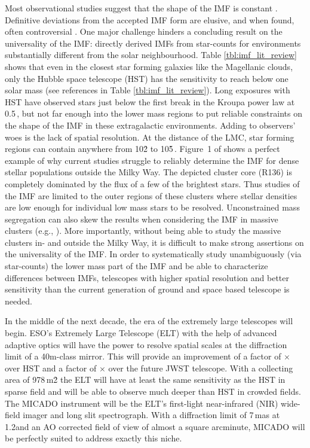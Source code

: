 Most observational studies suggest that the shape of the IMF is constant \citep{Lada2003-ip,Kroupa2002,Bastian2010}. Definitive deviations from the accepted IMF form are elusive, and when found, often controversial \citep{Van_Dokkum2010-gx,Conroy2012-hv,Drass2016-kp}. One major challenge hinders a concluding result on the universality of the IMF:  directly derived IMFs from star-counts for environments substantially different from the solar neighbourhood. 
Table \ref{tbl:imf_lit_review} shows that even in the closest star forming galaxies like the Magellanic clouds, only the Hubble space telescope (HST) has the sensitivity to reach below one solar mass (see references in Table \ref{tbl:imf_lit_review}). 
Long exposures with HST have observed stars just below the first break in the Kroupa power law at 0.5\,\msun \citep{dario2009,kalirai2013,geha2013}, but not far enough into the lower mass regions to put reliable constraints on the shape of the IMF in these extragalactic environments. 
Adding to observers' woes is the lack of spatial resolution. At the distance of the LMC, star forming regions can contain anywhere from 10\h2 to 10\h5\,\spa. 
Figure~1 of \citet{sirianni2000} shows a perfect example of why current studies struggle to reliably determine the IMF for dense stellar populations outside the Milky Way. The depicted cluster core (R136) is completely dominated by the flux of a few of the brightest stars.
Thus studies of the IMF are limited to the outer regions of these clusters where stellar densities are low enough for individual low mass stars to be resolved. Unconstrained mass segregation can also skew the results when considering the IMF in massive clusters (e.g., \cite{Ascenso2009-de}). More importantly, without being able to study the massive clusters in- and outside the Milky Way, it is difficult to make strong assertions on the universality of the IMF. In order to systematically study unambiguously (via star-counts) the lower mass part of the IMF and be able to characterize differences between IMFs, telescopes with higher spatial resolution and better sensitivity than the current generation of ground and space based telescope is needed.

In the middle of the next decade, the era of the extremely large telescopes will begin. 
ESO's Extremely Large Telescope (ELT) \citep{eelt} with the help of advanced adaptive optics \citep{maory} will have the power to resolve spatial scales at the diffraction limit of a 40m-class mirror. This will provide an improvement of a factor of $\times$ over HST and a factor of $\times$ over the future JWST telescope. 
With a collecting area of 978\,m\h2 the ELT will have at least the same sensitivity as the HST in sparse field and will be able to observe much deeper than HST in crowded fields. 
The MICADO instrument \citep{micado, micado2016} will be the ELT's first-light near-infrared (NIR) wide-field imager and long slit spectrograph. 
With a diffraction limit of 7\,mas at 1.2\um and an AO corrected field of view of almost a square arcminute, MICADO will be perfectly suited to address exactly this niche. 

